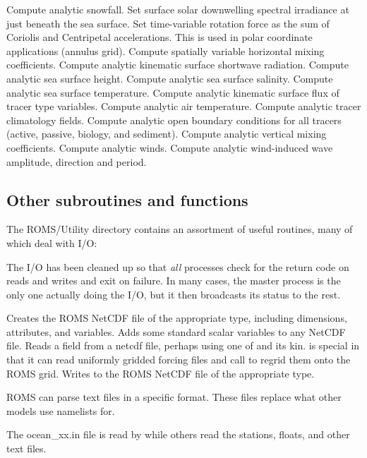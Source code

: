 \begin{klist}
       Compute analytic snowfall.
       Set surface solar downwelling spectral
     irradiance at just beneath the sea surface.
       Set time-variable rotation force as the
   sum of Coriolis and Centripetal accelerations.  This is used in polar
   coordinate applications (annulus grid).
      Compute spatially variable horizontal mixing
   coefficients.
       Compute analytic kinematic surface
   shortwave radiation.
       Compute analytic sea surface height.
       Compute analytic sea surface salinity.
       Compute analytic sea surface temperature.
       Compute analytic kinematic surface
   flux of tracer type variables.
       Compute analytic air temperature.
       Compute analytic tracer climatology fields.
       Compute analytic open boundary conditions for
   all tracers (active, passive, biology, and sediment).
       Compute analytic vertical mixing coefficients.
       Compute analytic winds.
       Compute analytic wind-induced wave amplitude,
     direction and period.
   \end{klist}

\subsection{Other subroutines and functions}
\label{Minor}
The ROMS/Utility directory contains an assortment of useful
routines, many of which deal with I/O:
\begin{klist}
 The I/O has been cleaned up so that {\em all}
processes check for the return code on reads and writes and exit on
failure. In many cases, the master process is the only one actually
doing the I/O, but it then broadcasts its status to the rest.
   \begin{klist}
      Creates the ROMS NetCDF file of the appropriate
   type, including dimensions, attributes, and variables.
      Adds some standard scalar variables to any NetCDF file.
      Reads a field from a netcdf file, perhaps
     using one of  and its kin. 
     is special in that it can read uniformly gridded forcing files
     and call  to regrid them onto the ROMS grid.
      Writes to the ROMS NetCDF file of the appropriate type.
   \end{klist}
 ROMS can parse text files in a specific format.
These files replace what other models use namelists for.
  \begin{klist}
     The ocean\_xx.in file is read by 
    while others read the stations, floats, and other text files.
  \end{klist}
\end{klist}

